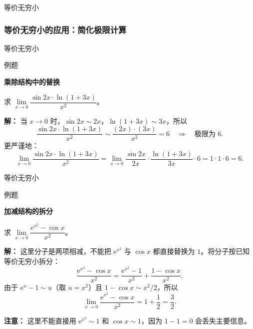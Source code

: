 \documentclass[aspectratio=169,10pt,fontset=fandol]{ctexbeamer}
\newenvironment{custom}[1]{\par\noindent\textbf{#1}\quad}{\par\vspace{0.8em}}
\newcommand{\ee}{\mathrm{e}}
\begin{document}
\begin{frame}[t,fragile]{等价无穷小}
\footnotesize
{\footnotesize
\subsubsection{等价无穷小的应用：简化极限计算}


}
\end{frame}
\begin{frame}[t,fragile]{等价无穷小}
\footnotesize
\begin{block}{例题}
{\footnotesize
\textbf{乘除结构中的替换}\par

求 \(\lim\limits_{x \to 0} \dfrac{\sin 2x \cdot \ln(1+3x)}{x^2}\)。

}
\end{block}
\pause
{\footnotesize
\textbf{解：}
当 \(x \to 0\) 时，\(\sin 2x \sim 2x\)，\(\ln(1+3x) \sim 3x\)，所以
\[
\dfrac{\sin 2x \cdot \ln(1+3x)}{x^2} \sim \dfrac{(2x) \cdot (3x)}{x^2} = 6 \quad \Rightarrow \quad \text{极限为 } 6.
\]
更严谨地：
\[
\lim_{x \to 0} \dfrac{\sin 2x \cdot \ln(1+3x)}{x^2} = \lim_{x \to 0} \dfrac{\sin 2x}{2x} \cdot \dfrac{\ln(1+3x)}{3x} \cdot 6 = 1 \cdot 1 \cdot 6 = 6.
\]

}
\end{frame}
\begin{frame}[t,fragile]{等价无穷小}
\footnotesize
\begin{block}{例题}
{\footnotesize
\textbf{加减结构的拆分}\par

求 \(\lim\limits_{x \to 0} \dfrac{\ee^{x^2} - \cos x}{x^2}\)。

}
\end{block}
\pause
{\footnotesize
\textbf{解：}
这里分子是两项相减，不能把 \(\ee^{x^2}\) 与 \(\cos x\) 都直接替换为 \(1\)。将分子按已知等价无穷小拆分：
\[
\frac{\ee^{x^2}-\cos x}{x^2}
=\frac{\ee^{x^2}-1}{x^2}+\frac{1-\cos x}{x^2}.
\]
由于 \(\ee^u-1\sim u\)（取 \(u=x^2\)）且 \(1-\cos x\sim x^2/2\)，所以
\[
\lim_{x\to0}\frac{\ee^{x^2}-\cos x}{x^2}
=1+\frac12=\frac32.
\]

\textbf{注意：} 这里不能直接用 \(\ee^{x^2}\sim1\) 和 \(\cos x\sim1\)，因为 \(1-1=0\) 会丢失主要信息。

}
\end{frame}
\end{document}
